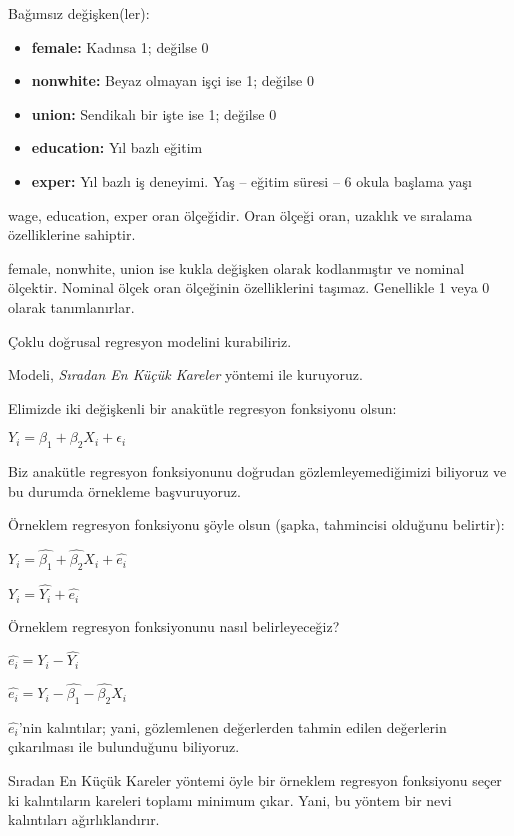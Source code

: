 \documentclass[
]{book}
\begin{document}
Bağımsız değişken(ler):

\begin{itemize}
\item
  \textbf{female:} Kadınsa 1; değilse 0
\item
  \textbf{nonwhite:} Beyaz olmayan işçi ise 1; değilse 0
\item
  \textbf{union:} Sendikalı bir işte ise 1; değilse 0
\item
  \textbf{education:} Yıl bazlı eğitim
\item
  \textbf{exper:} Yıl bazlı iş deneyimi. Yaş -- eğitim süresi -- 6 okula başlama yaşı
\end{itemize}

wage, education, exper oran ölçeğidir. Oran ölçeği oran, uzaklık ve sıralama özelliklerine sahiptir.

female, nonwhite, union ise kukla değişken olarak kodlanmıştır ve nominal ölçektir. Nominal ölçek oran ölçeğinin özelliklerini taşımaz. Genellikle 1 veya 0 olarak tanımlanırlar.

Çoklu doğrusal regresyon modelini kurabiliriz.

Modeli, \emph{Sıradan En Küçük Kareler} yöntemi ile kuruyoruz.

Elimizde iki değişkenli bir anakütle regresyon fonksiyonu olsun:

\(Y_i = \beta_1 + \beta_2X_i + \epsilon_i\)

Biz anakütle regresyon fonksiyonunu doğrudan gözlemleyemediğimizi biliyoruz ve bu durumda örnekleme başvuruyoruz.

Örneklem regresyon fonksiyonu şöyle olsun (şapka, tahmincisi olduğunu belirtir):

\(Y_i = \hat{\beta_1} + \hat{\beta_2}X_i + \hat{e_i}\)

\(Y_i = \hat{Y_i} + \hat{e_i}\)

Örneklem regresyon fonksiyonunu nasıl belirleyeceğiz?

\(\hat{e_i} = Y_i - \hat{Y_i}\)

\(\hat{e_i} = Y_i - \hat{\beta_1} - \hat{\beta_2}X_i\)

\(\hat{e_i}\)'nin kalıntılar; yani, gözlemlenen değerlerden tahmin edilen değerlerin çıkarılması ile bulunduğunu biliyoruz.

Sıradan En Küçük Kareler yöntemi öyle bir örneklem regresyon fonksiyonu seçer ki kalıntıların kareleri toplamı minimum çıkar. Yani, bu yöntem bir nevi kalıntıları ağırlıklandırır.
\end{document}
